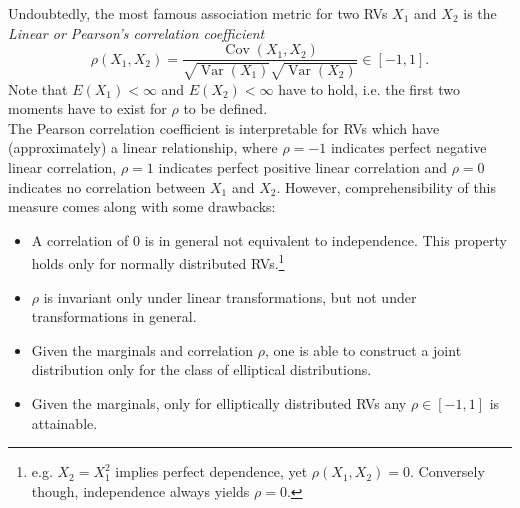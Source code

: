 
Undoubtedly, the most famous association metric for two \acp{RV} $X_1$ and $X_2$ is the \textit{Linear or Pearson's correlation coefficient}
\begin{equation}
\rho\left(X_{1}, X_{2}\right)=
\frac{\operatorname{Cov}\left(X_{1}, X_{2}\right)}{\sqrt{\operatorname{Var} (X_{1})} \sqrt{\operatorname{Var} (X_{2})}}
\in [-1, 1].
\label{eq:pearsons_rho}
\end{equation}
Note that $E(X_1) < \infty$ and $E(X_2) < \infty$ have to hold, i.e. the first two moments have to exist for $\rho$ to be defined.\\
The Pearson correlation coefficient is interpretable for \acp{RV} which have (approximately) a linear relationship, where $\rho = -1$ indicates perfect negative linear correlation, $\rho=1$ indicates perfect positive linear correlation and $\rho=0$ indicates no correlation between $X_1$ and $X_2$. However, comprehensibility of this measure comes along with some drawbacks:
\begin{itemize}
\item A correlation of $0$ is in general not equivalent to independence. This property holds only for normally distributed \acp{RV}.\footnote{e.g. $X_2 =X_1^2$ implies perfect dependence, yet $\rho(X_1,X_2) = 0$. Conversely though, independence always yields $\rho=0$.}
\item $\rho$ is invariant only under linear transformations, but not under transformations in general.
\item Given the marginals and correlation $\rho$, one is able to construct a joint distribution only for the class of elliptical distributions. 
\item Given the marginals, only for elliptically distributed \acp{RV} any $\rho \in [-1,1]$ is attainable.
\end{itemize}








